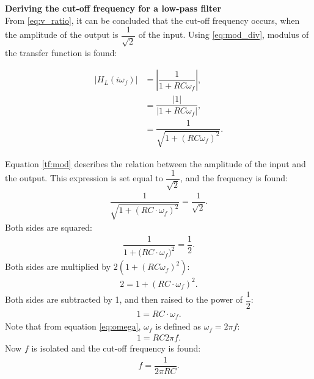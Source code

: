 \noindent \textbf{Deriving the cut-off frequency for a low-pass filter}\\

\noindent From \eqref{eq:v_ratio}, it can be concluded that the cut-off frequency occurs, when the amplitude of the output is $\dfrac{1}{\sqrt{2}}$ of the input. Using \eqref{eq:mod_div}, modulus of the transfer function is found:

\begin{align}
\left|H_{L}(i \omega_f) \right| &=  \left|\dfrac{1}{1+RC \omega_f} \right|, \nonumber
\\
&=\dfrac{|1|}{|1+RC\omega_f |}, \nonumber
\\
&=  \dfrac{1}{\sqrt{1+(RC \omega_f)^2}}. \label{tf:mod}
\end{align}

\noindent Equation \eqref{tf:mod} describes the relation between the amplitude of the input and the output. This expression is set equal to $\dfrac{1}{\sqrt{2}}$, and the frequency is found:
\\
\begin{align*}
\dfrac{1}{\sqrt{1+ \left(RC \cdot \omega_f \right)^2}} = \dfrac{1}{\sqrt{2}}.
\end{align*}
Both sides are squared:
\begin{align*}
\dfrac{1}{1+ \big(RC \cdot \omega_f \big)^2} = \dfrac{1}{2}.
\end{align*}
	Both sides are multiplied by $2(1+(RC\omega_f)^2)$:
\begin{align*}
2 = 1+ \left(RC \cdot \omega_f \right)^2.
\end{align*}
Both sides are subtracted by 1, and then raised to the power of $\dfrac{1}{2}$:
\begin{align*}
1 = RC \cdot \omega_f .
\end{align*}
Note that from equation \eqref{eq:omega}, $\omega_f$ is defined as $\omega_f=2 \pi f$:
\begin{align*}
1 = RC 2\pi f .
\end{align*}
Now $f$ is isolated and the cut-off frequency is found:
\begin{align*}
f=\dfrac{1}{2\pi RC}.
\end{align*}

